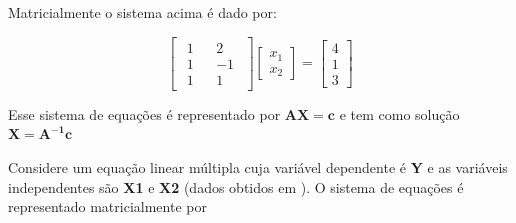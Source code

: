 \documentclass[
]{book}
\newenvironment{Shaded}{\begin{snugshade}}{\end{snugshade}}
\newcommand{\CommentTok}[1]{\textcolor[rgb]{0.56,0.35,0.01}{\textit{#1}}}
\newcommand{\DataTypeTok}[1]{\textcolor[rgb]{0.13,0.29,0.53}{#1}}
\newcommand{\DecValTok}[1]{\textcolor[rgb]{0.00,0.00,0.81}{#1}}
\newcommand{\KeywordTok}[1]{\textcolor[rgb]{0.13,0.29,0.53}{\textbf{#1}}}
\newcommand{\NormalTok}[1]{#1}
\newcommand{\OperatorTok}[1]{\textcolor[rgb]{0.81,0.36,0.00}{\textbf{#1}}}
\newcommand{\StringTok}[1]{\textcolor[rgb]{0.31,0.60,0.02}{#1}}
\begin{document}
Matricialmente o sistema acima é dado por:

\[\left[ {\begin{array}{*{20}{c}}{\begin{array}{*{20}{l}}1\\1\\1\end{array}}&{\begin{array}{*{20}{c}}2\\{ - 1}\\1\end{array}}\end{array}} \right]\left[ {\begin{array}{*{20}{c}}{{x_1}}\\{{x_2}}\end{array}} \right] = \left[ {\begin{array}{*{20}{c}}4\\1\\3\end{array}} \right]\]

Esse sistema de equações é representado por \({\boldsymbol{AX}} = {\boldsymbol{c}}\) e tem como solução \({\boldsymbol{X = }}{{\boldsymbol{A}}^{{\boldsymbol{ - 1}}}}{\boldsymbol{c}}\)

\begin{Shaded}
\end{Shaded}

Considere um equação linear múltipla cuja variável dependente é \textbf{Y} e as variáveis independentes são \textbf{X1} e \textbf{X2} (dados obtidos em \citet{Kutner2005}). O sistema de equações é representado matricialmente por 
\end{document}
